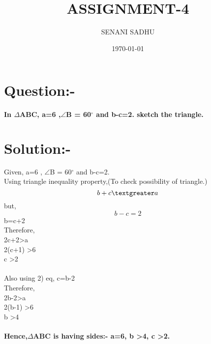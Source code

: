 \documentclass[a4paper,12pt]{article}
\title{ASSIGNMENT-4}
\author{SENANI SADHU}
\date{\today}
\begin{document}
	\maketitle
	\section{Question:-}
	\paragraph{In $\Delta$ABC, a=6 ,$\angle$B = 60$^{\circ}$ and b-c=2. sketch the triangle.}
	\section{Solution:-}
	Given, a=6 , $\angle$B = 60$^{\circ}$ and b-c=2.\\
	Using triangle inequality property,\hspace{1cm}(To check possibility of triangle.)\\
	\begin{equation}
		b+c \textgreater  a
	\end{equation}
	but,\\
	\begin{equation}
		 b-c=2
	\end{equation}
\hspace{6cm}b=c+2\\
Therefore,\\
\hspace{4cm}2c+2\textgreater a\\
\hspace{4cm}2(c+1) \textgreater 6\\
\hspace{4cm}c \textgreater 2\\\\
Also using 2) eq, c=b-2\\
Therefore,\\
\hspace{4cm}2b-2\textgreater a\\
\hspace{4cm}2(b-1) \textgreater 6\\
\hspace{4cm}b \textgreater 4
\paragraph{Hence,$\Delta$ABC is having sides:- a=6, b \textgreater 4, c \textgreater 2.}
\end{document}
